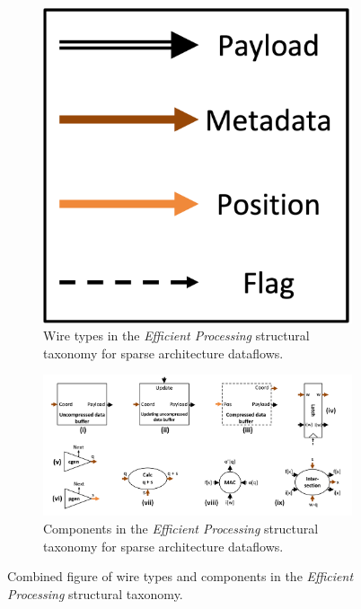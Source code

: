 \begin{figure}[H]
    \centering
    \begin{subfigure}[b]{0.2\textwidth}
        \centering
        \includegraphics[width=\textwidth]{figures/efficient_processing_wire_legend.png}
        \caption{Wire types in the \textit{Efficient Processing} structural taxonomy for sparse architecture dataflows.}
        \label{fig:efficient_processing_wire_legend}
    \end{subfigure}
    \vspace{1cm} %
    \begin{subfigure}[b]{0.95\textwidth}
        \centering
        \includegraphics[width=\textwidth]{figures/efficient_processing_taxo.png}
        \caption{Components in the \textit{Efficient Processing} structural taxonomy for sparse architecture dataflows.}
        \label{fig:efficient_processing_taxo}
    \end{subfigure}
    \caption{Combined figure of wire types and components in the \textit{Efficient Processing} structural taxonomy.}
\end{figure}


